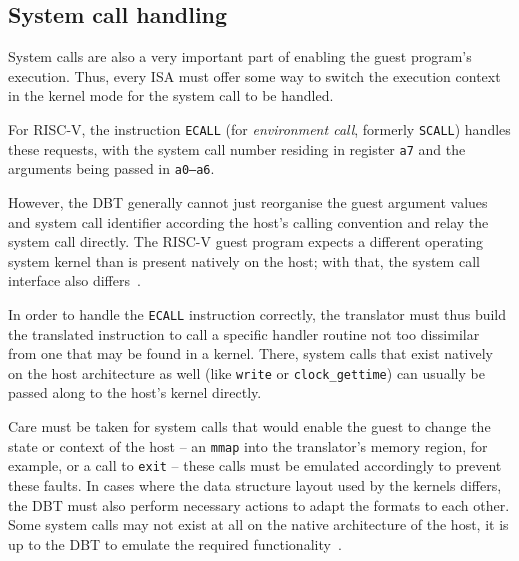 \subsection{System call handling}
\label{sec:syscall-handling}
System calls are also a very important part of enabling the guest program's execution.
Thus, every ISA must offer some way to switch the execution context in the kernel mode for the system call to be handled.

For RISC-V, the instruction \texttt{ECALL} (for \textit{environment call}, formerly \texttt{SCALL}) handles these requests, with the system call number residing in register \texttt{a7} and the arguments being passed in \texttt{a0--a6}.

However, the DBT generally cannot just reorganise the guest argument values and system call identifier according the host's calling convention and relay the system call directly.
The RISC-V guest program expects a different operating system kernel than is present natively on the host;
with that, the system call interface also differs~\cite[S. 2f.]{bintrans}.

In order to handle the \texttt{ECALL} instruction correctly, the translator must thus build the translated instruction to call a specific handler routine not too dissimilar from one that may be found in a kernel.
There, system calls that exist natively on the host architecture as well (like \texttt{write} or \texttt{clock\_gettime}) can usually be passed along to the host's kernel directly.

Care must be taken for system calls that would enable the guest to change the state or context of the host -- an \texttt{mmap} into the translator's memory region, for example, or a call to \texttt{exit} -- these calls must be emulated accordingly to prevent these faults.
In cases where the data structure layout used by the kernels differs, the DBT must also perform necessary actions to adapt the formats to each other.
Some system calls may not exist at all on the native architecture of the host, it is up to the DBT to emulate the required functionality~\cite[S. 2f.]{bintrans}.


















